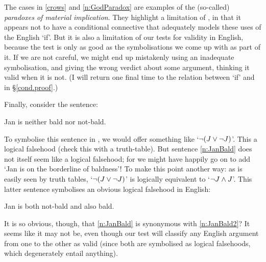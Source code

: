 The cases in \ref{crows} and \ref{n:GodParadox} are examples of the (so-called) \emph{paradoxes of material implication}. They highlight a limitation of \TFL, in that it appears not to have a conditional connective that adequately models these uses of the English `if'. But it is also a limitation of our tests for validity in English, because the test is only as good as the symbolisations we come up with as part of it. If we are not careful, we might end up mistakenly using an inadequate symbolisation, and giving the wrong verdict about some argument, thinking it valid when it is not.  (I will return one final time to the relation between `if' and {\eif} in §\ref{cond.proof}.)


Finally, consider the sentence:
	\begin{earg}
		\item[\ex{n:JanBald}] Jan is neither bald nor not-bald.
	\end{earg}
To symbolise this sentence in \TFL, we would offer something like `$\neg (J \vee \neg J)$'. This a logical falsehood (check this with a truth-table). But sentence \ref{n:JanBald} does not itself seem like a logical falsehood; for we might have happily go on to add `Jan is on the borderline of baldness'! To make this point another way: as is easily seen by truth tables, `$\neg (J \vee \neg J)$' is logically equivalent to `$\neg J \wedge J$'. This latter sentence symbolises an obvious logical falsehood in English:
	\begin{earg}
		\item[\ex{n:JanBald2}]  Jan is both not-bald and also bald.
	\end{earg}
It is so obvious, though, that \ref{n:JanBald} is synonymous with \ref{n:JanBald2}? It seems like it may not be, even though our test will classify any English argument from one to the other as valid (since both are symbolised as logical falsehoods, which degenerately entail anything). 

